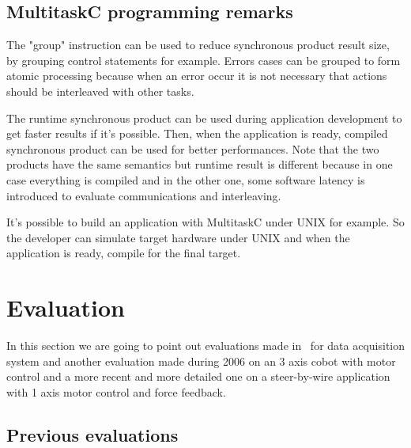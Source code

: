 \documentclass[10pt]{report}
\begin{document}
\section{MultitaskC programming remarks}

The "group" instruction can be used to reduce synchronous product result size, by grouping control
statements for example. Errors cases can be grouped to form atomic processing because when an error
occur it is not necessary that actions should be interleaved with other tasks.

The runtime synchronous product can be used during application development to get faster results
if it's possible. Then, when the application is ready, compiled synchronous product can be used for
better performances. Note that the two products have the same semantics but runtime result is
different because in one case everything is compiled and in the other one, some software latency
is introduced to evaluate communications and interleaving.

It's possible to build an application with MultitaskC under UNIX for example. So the developer can simulate
target hardware under UNIX and when the application is ready, compile for the final target.

\chapter{Evaluation}
\label{sec:evaluation}

In this section we are going to point out evaluations made in~\cite{Delchini:95} for data acquisition system
and another evaluation made during 2006 on an 3 axis cobot with motor control and a more recent and more
detailed one on a steer-by-wire application with 1 axis motor control and force feedback.

\section{Previous evaluations}
\end{document}
